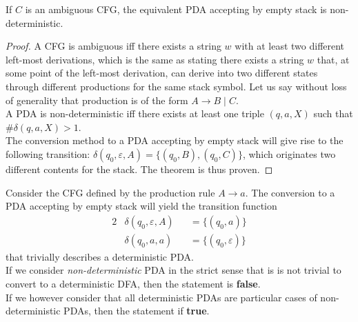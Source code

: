 \documentclass[docid=CA08]{tcom_CA}
\begin{document}
\setcounter{chapter}{7}
{

\begin{theorem}
If $C$ is an ambiguous CFG, the equivalent PDA accepting by empty stack is non-deterministic.
\end{theorem}
\begin{proof}
A CFG is ambiguous iff there exists a string $w$ with at least two different left-most derivations, which is the same as stating there exists a string $w$ that, at some point of the left-most derivation, can derive into two different states through different productions for the same stack symbol. Let us say without loss of generality that production is of the form $A \rightarrow B\mid C$.\\
A PDA is non-deterministic iff there exists at least one triple $(q,a,X)$ such that $\#\delta(q, a, X) > 1$.\\
The conversion method to a PDA accepting by empty stack will give rise to the following transition: $\delta(q_0, \varepsilon, A)=\{(q_0,B),(q_0,C)\}$, which originates two different contents for the stack. The theorem is thus proven.
\end{proof}
Consider the CFG defined by the production rule $A \rightarrow a$. The conversion to a PDA accepting by empty stack will yield the transition function
\begin{alignat*}{2}
	&\delta(q_0,\varepsilon,A) &&= \{(q_0, a)\}\\
	&\delta(q_0,a          ,a) &&= \{(q_0, \varepsilon)\} 
\end{alignat*}
that trivially describes a deterministic PDA.\\
If we consider \textit{non-deterministic} PDA in the strict sense that is is not trivial to convert to a deterministic DFA, then the statement is \textbf{false}.\\
If we however consider that all deterministic PDAs are particular cases of non-deterministic PDAs, then the statement if \textbf{true}.
}
\end{document}
